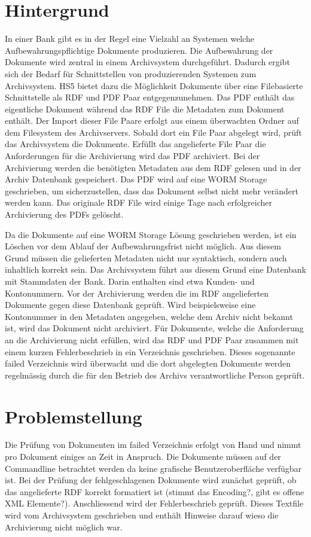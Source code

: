 \documentclass[a4paper,oneside, 12pt]{report}
\begin{document}
\section{Hintergrund}
In einer Bank gibt es in der Regel eine Vielzahl an Systemen welche Aufbewahrungspflichtige Dokumente produzieren. Die Aufbewahrung der Dokumente wird zentral in einem Archivsystem durchgeführt. Dadurch ergibt sich der Bedarf für Schnittstellen von produzierenden Systemen zum Archivsystem. \ac{HS5} bietet dazu die Möglichkeit Dokumente über eine Filebasierte Schnittstelle als \ac{RDF} und PDF Paar entgegenzunehmen. Das PDF enthält das eigentliche Dokument während das \ac{RDF} File die Metadaten zum Dokument enthält. Der Import dieser File Paare erfolgt aus einem überwachten Ordner auf dem Filesystem des Archivservers. Sobald dort ein File Paar abgelegt wird, prüft das Archivsystem die Dokumente. Erfüllt das angelieferte File Paar die Anforderungen für die Archivierung wird das PDF archiviert. Bei der Archivierung werden die benötigten Metadaten aus dem \ac{RDF} gelesen und in der Archiv Datenbank gespeichert. Das PDF wird auf eine \ac{WORM} Storage geschrieben, um sicherzustellen, dass das Dokument selbst nicht mehr verändert werden kann. Das originale \ac{RDF} File wird einige Tage nach erfolgreicher Archivierung des PDFs gelöscht.

Da die Dokumente auf eine \ac{WORM} Storage Lösung geschrieben werden, ist ein Löschen vor dem Ablauf der Aufbewahrungsfrist nicht möglich. Aus diesem Grund müssen die gelieferten Metadaten nicht nur syntaktisch, sondern auch inhaltlich korrekt sein. Das Archivsystem führt aus diesem Grund eine Datenbank mit Stammdaten der Bank. Darin enthalten sind etwa Kunden- und Kontonummern. Vor der Archivierung werden die im \ac{RDF} angelieferten Dokumente gegen diese Datenbank geprüft. Wird beispielsweise eine Kontonummer in den Metadaten angegeben, welche dem Archiv nicht bekannt ist, wird das Dokument nicht archiviert. Für Dokumente, welche die Anforderung an die Archivierung nicht erfüllen, wird das RDF und PDF Paar zusammen mit einem kurzen Fehlerbeschrieb in ein Verzeichnis geschrieben. Dieses sogenannte failed Verzeichnis wird überwacht und die dort abgelegten Dokumente werden regelmässig durch die für den Betrieb des Archivs verantwortliche Person geprüft.

\section{Problemstellung}
Die Prüfung von Dokumenten im failed Verzeichnis erfolgt von Hand und nimmt pro Dokument einiges an Zeit in Anspruch. Die Dokumente müssen auf der Commandline betrachtet werden da keine grafische Benutzeroberfläche verfügbar ist. Bei der Prüfung der fehlgeschlagenen Dokumente wird zunächst geprüft, ob das angelieferte RDF korrekt formatiert ist (stimmt das Encoding?, gibt es offene XML Elemente?). Anschliessend wird der Fehlerbeschrieb geprüft. Dieses Textfile wird vom Archivsystem geschrieben und enthält Hinweise darauf wieso die Archivierung nicht möglich war.
\end{document}
